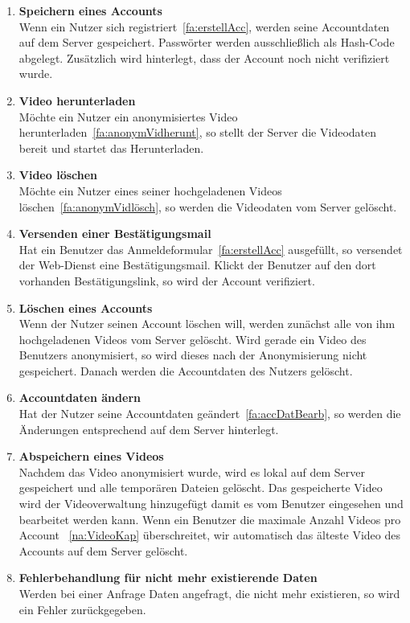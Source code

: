 \begin{enumerate}
\item \label{fa:accSpeichern}\textbf{Speichern eines Accounts} \hfill \\
Wenn ein Nutzer sich registriert~\eqref{fa:erstellAcc}, werden seine Accountdaten auf dem Server gespeichert. Passwörter werden ausschließlich als \gls{Hash-Code} abgelegt. Zusätzlich wird hinterlegt, dass der Account noch nicht verifiziert wurde.

\item \label{fa:vidHerunterladen}\textbf{Video herunterladen} \hfill \\
Möchte ein Nutzer ein anonymisiertes Video herunterladen~\eqref{fa:anonymVidherunt}, so stellt der Server die Videodaten bereit und startet das Herunterladen.

\item \label{fa:vidLöschen}\textbf{Video löschen} \hfill \\
Möchte ein Nutzer eines seiner hochgeladenen Videos löschen~\eqref{fa:anonymVidlösch}, so werden die Videodaten vom Server gelöscht.

\item \label{fa:mailSenden}\textbf{Versenden einer Bestätigungsmail} \hfill \\
Hat ein Benutzer das Anmeldeformular~\eqref{fa:erstellAcc} ausgefüllt, so versendet der \gls{Web-Dienst} eine Bestätigungsmail. Klickt der Benutzer auf den dort vorhanden Bestätigungslink, so wird der Account verifiziert.

\item \label{fa:accLöschen}\textbf{Löschen eines Accounts} \hfill \\
Wenn der Nutzer seinen Account löschen will, werden zunächst alle von ihm hochgeladenen Videos vom Server gelöscht. Wird gerade ein Video des Benutzers anonymisiert, so wird dieses nach der Anonymisierung nicht gespeichert. Danach werden die Accountdaten des Nutzers gelöscht.

\item \label{fa:accÄndern}\textbf{Accountdaten ändern} \hfill \\
Hat der Nutzer seine Accountdaten geändert~\eqref{fa:accDatBearb}, so werden die Änderungen entsprechend auf dem Server hinterlegt.

\item \label{fa:speichVideo}\textbf{Abspeichern eines  Videos} \hfill \\
Nachdem das Video anonymisiert wurde, wird es lokal auf dem Server gespeichert und alle temporären Dateien gelöscht. Das gespeicherte Video wird der Videoverwaltung hinzugefügt damit es vom Benutzer eingesehen und bearbeitet werden kann. Wenn ein Benutzer die maximale Anzahl Videos pro Account ~\eqref{na:VideoKap} überschreitet, wir automatisch das älteste Video des Accounts auf dem Server gelöscht.

\item  \label{fa:fehlerbehandlung}\textbf{Fehlerbehandlung für nicht mehr existierende Daten} \hfill \\
Werden bei einer Anfrage Daten angefragt, die nicht mehr existieren, so wird ein Fehler zurückgegeben.
\end{enumerate}
